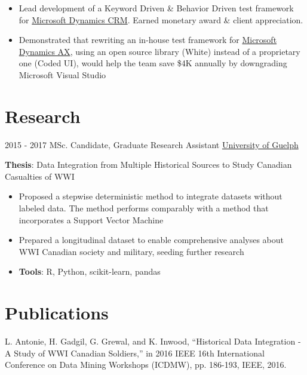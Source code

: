 \documentclass[letterpaper]{twentysecondcv} %
\begin{document}
\begin{twenty}
{\begin{itemize}
        \item Lead development of a Keyword Driven \& Behavior Driven test framework for \href{https://www.microsoft.com/en-ca/dynamics/crm.aspx}{Microsoft Dynamics CRM}. Earned monetary award \& client appreciation.
        \item Demonstrated that rewriting an in-house test framework for \href{https://www.microsoft.com/en-ca/dynamics/erp-ax-overview.aspx}{Microsoft Dynamics AX}, using an open source library (White) instead of a proprietary one (Coded UI), would help the team save \$4K annually by downgrading Microsoft Visual Studio
    \end{itemize}
    	}
        
\end{twenty}

\section{Research}
\begin{twenty}
	\twentyitem
    	{2015 - 2017}
		{}
        {MSc. Candidate, Graduate Research Assistant}
        {\href{http://www.uoguelph.ca/}{University of Guelph}}
        {}
        {
       	\textbf{Thesis}: Data Integration from Multiple Historical Sources to Study Canadian Casualties of WWI
        {\begin{itemize}
        \item Proposed a stepwise deterministic method to integrate datasets without labeled data. The method performs comparably with a method that incorporates a Support Vector Machine
        \item Prepared a longitudinal dataset to enable comprehensive analyses about WWI Canadian society and military, seeding further research
        \item \textbf{Tools}: R, Python, scikit-learn, pandas \vspace{2mm}
		\end{itemize}}
        }
\end{twenty}

\section{Publications}
L. Antonie, H. Gadgil, G. Grewal, and K. Inwood, “Historical Data Integration - A Study of WWI Canadian Soldiers,” in 2016 IEEE 16th International Conference on Data Mining Workshops (ICDMW), pp. 186-193, IEEE, 2016. \vspace{2mm}
\end{document}

